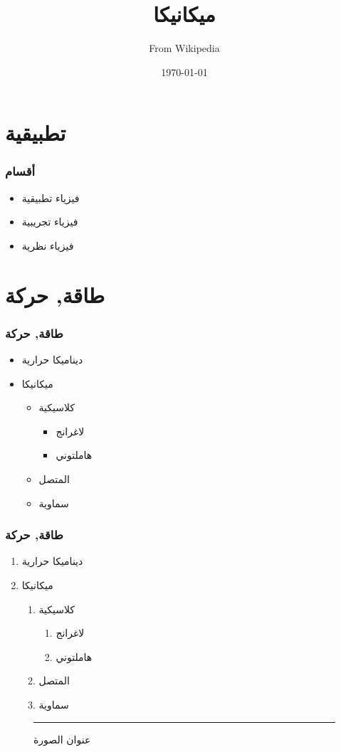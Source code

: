 \documentclass[hyperref=unicode]{beamer}
\title{ميكانيكا}
\author{From Wikipedia}
\date{\today}
\begin{document}
\begin{frame}
\titlepage
\end{frame}

\begin{frame}
\frametitle{\contentsname}
\tableofcontents
\end{frame}

\section{تطبيقية}

\begin{frame}
\frametitle{أقسام}
\begin{itemize}
\item فيزياء تطبيقية
\item فيزياء تجريبية
\item فيزياء نظرية
\end{itemize}



\end{frame}

\section{طاقة, حركة}

\begin{frame}
\frametitle{طاقة, حركة}
\begin{itemize}
\item ديناميكا حرارية
\item ميكانيكا
\begin{itemize}
\item كلاسيكية
\begin{itemize}
\item لاغرانج
\item هاملتوني
\end{itemize}
\item المتصل
\item سماوية
\end{itemize}
\end{itemize}
\end{frame}

\begin{frame}
\frametitle{طاقة, حركة}
\begin{enumerate}
\item ديناميكا حرارية
\item ميكانيكا
\begin{enumerate}
\item كلاسيكية
\begin{enumerate}
\item لاغرانج
\item هاملتوني
\end{enumerate}
\item المتصل
\item سماوية
\end{enumerate}
\end{enumerate}

\begin{figure}
\centering
\rule{2cm}{2cm}
\caption{عنوان الصورة}
\end{figure}


\end{frame}
\end{document}
